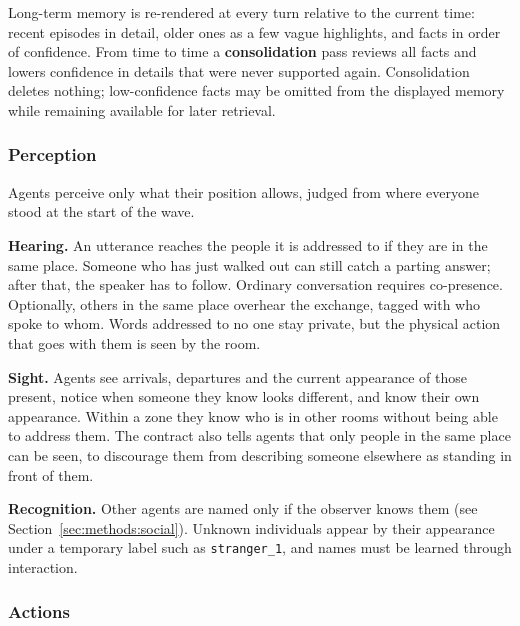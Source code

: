 Long-term memory is re-rendered at every turn relative to the current time: recent episodes in detail, older ones as a few vague highlights, and facts in order of confidence. From time to time a \textbf{consolidation} pass reviews all facts and lowers confidence in details that were never supported again. Consolidation deletes nothing; low-confidence facts may be omitted from the displayed memory while remaining available for later retrieval.

\subsubsection{Perception}
\label{sec:methods:perception}

Agents perceive only what their position allows, judged from where everyone stood at the start of the wave.

\textbf{Hearing.} An utterance reaches the people it is addressed to if they are in the same place. Someone who has just walked out can still catch a parting answer; after that, the speaker has to follow. Ordinary conversation requires co-presence. Optionally, others in the same place overhear the exchange, tagged with who spoke to whom. Words addressed to no one stay private, but the physical action that goes with them is seen by the room.

\textbf{Sight.} Agents see arrivals, departures and the current appearance of those present, notice when someone they know looks different, and know their own appearance. Within a zone they know who is in other rooms without being able to address them. The contract also tells agents that only people in the same place can be seen, to discourage them from describing someone elsewhere as standing in front of them.

\textbf{Recognition.} Other agents are named only if the observer knows them (see Section~\ref{sec:methods:social}). Unknown individuals appear by their appearance under a temporary label such as \texttt{stranger\_1}, and names must be learned through interaction.

\subsubsection{Actions}
\label{sec:methods:actions}

